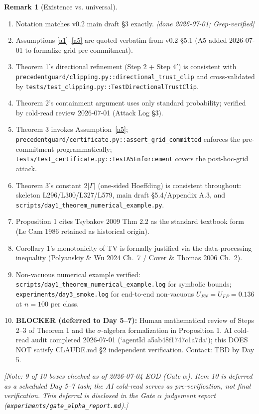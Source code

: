\documentclass[11pt]{article}
\newcommand{\NOTE}[1]{{\color{blue}\textit{[Note: #1]}}}
\theoremstyle{plain}
\theoremstyle{definition}
\newtheorem{remark}{Remark}
\begin{document}
\begin{remark}[Existence vs. universal]
\begin{enumerate}[label=$\Box$, leftmargin=*, noitemsep]
\item[$\boxtimes$] Notation matches v0.2 main draft \S 3 exactly. \emph{[done 2026-07-01; Grep-verified]}
\item[$\boxtimes$] Assumptions \ref{a1}--\ref{a5} are quoted verbatim from v0.2 \S 5.1 (A5 added 2026-07-01 to formalize grid pre-commitment).
\item[$\boxtimes$] Theorem 1's directional refinement (Step 2 + Step 4$'$) is consistent with \texttt{precedentguard/clipping.py::directional\_trust\_clip} and cross-validated by \texttt{tests/test\_clipping.py::TestDirectionalTrustClip}.
\item[$\boxtimes$] Theorem 2's containment argument uses only standard probability; verified by cold-read review 2026-07-01 (Attack Log \S 3).
\item[$\boxtimes$] Theorem 3 invokes Assumption~\ref{a5}; \texttt{precedentguard/certificate.py::assert\_grid\_committed} enforces the pre-commitment programmatically; \texttt{tests/test\_certificate.py::TestA5Enforcement} covers the post-hoc-grid attack.
\item[$\boxtimes$] Theorem 3's constant $2|\Gamma|$ (one-sided Hoeffding) is consistent throughout: skeleton L296/L300/L327/L579, main draft \S 5.4/Appendix A.3, and \texttt{scripts/day1\_theorem\_numerical\_example.py}.
\item[$\boxtimes$] Proposition 1 cites Tsybakov 2009 Thm 2.2 as the standard textbook form (Le Cam 1986 retained as historical origin).
\item[$\boxtimes$] Corollary 1's monotonicity of TV is formally justified via the data-processing inequality (Polyanskiy \& Wu 2024 Ch.~7 / Cover \& Thomas 2006 Ch.~2).
\item[$\boxtimes$] Non-vacuous numerical example verified: \texttt{scripts/day1\_theorem\_numerical\_example.log} for symbolic bounds; \texttt{experiments/day3\_smoke.log} for end-to-end non-vacuous $U_{FN}=U_{FP}=0.136$ at $n=100$ per class.
\item[$\square$] \textbf{BLOCKER (deferred to Day 5--7):} Human mathematical review of Steps 2--3 of Theorem 1 and the $\sigma$-algebra formalization in Proposition 1. AI cold-read audit completed 2026-07-01 (`agentId a5ab48f1747c1a7da`); this DOES NOT satisfy CLAUDE.md \S2 independent verification. Contact: TBD by Day 5.
\end{enumerate}

\NOTE{9 of 10 boxes checked as of 2026-07-04 EOD (Gate $\alpha$). Item 10 is deferred as a scheduled Day 5--7 task; the AI cold-read serves as pre-verification, not final verification. This deferral is disclosed in the Gate $\alpha$ judgement report (\texttt{experiments/gate\_alpha\_report.md}).}


\end{remark}
\end{document}
